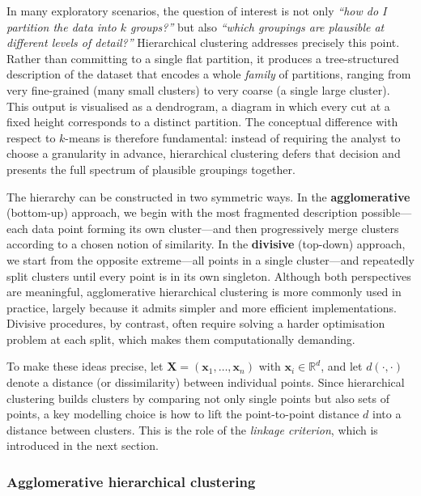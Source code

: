 In many exploratory scenarios, the question of interest is not only \emph{``how do I
partition the data into $k$ groups?''} but also \emph{``which groupings are plausible at
different levels of detail?''} Hierarchical clustering addresses precisely this point. Rather
than committing to a single flat partition, it produces a \alert{tree-structured} description
of the dataset that encodes a whole \emph{family} of partitions, ranging from very
fine-grained (many small clusters) to very coarse (a single large cluster). This output is
visualised as a \alert{dendrogram}, a diagram in which every cut at a fixed height
corresponds to a distinct partition. The conceptual difference with respect to $k$-means is
therefore fundamental: instead of requiring the analyst to choose a granularity in advance,
hierarchical clustering defers that decision and presents the full spectrum of plausible
groupings together.

The hierarchy can be constructed in two symmetric ways. In the \textbf{agglomerative}
(bottom-up) approach, we begin with the most fragmented description possible---each
data point forming its own cluster---and then progressively merge clusters according to a
chosen notion of similarity. In the \textbf{divisive} (top-down) approach, we start from the
opposite extreme---all points in a single cluster---and repeatedly split clusters until every
point is in its own singleton. Although both perspectives are meaningful, agglomerative
hierarchical clustering is more commonly used in practice, largely because it admits simpler
and more efficient implementations. Divisive procedures, by contrast, often require solving
a harder optimisation problem at each split, which makes them computationally demanding.

To make these ideas precise, let $\mathbf{X}=(\mathbf{x}_1,\ldots,\mathbf{x}_n)$ with
$\mathbf{x}_i\in\mathbb{R}^d$, and let $d(\cdot,\cdot)$ denote a distance (or
dissimilarity) between individual points. Since hierarchical clustering builds clusters by
comparing not only single points but also sets of points, a key modelling choice is how to
lift the point-to-point distance $d$ into a distance between clusters. This is the role of the
\emph{linkage criterion}, which is introduced in the next section.

\subsubsection*{Agglomerative hierarchical clustering}

